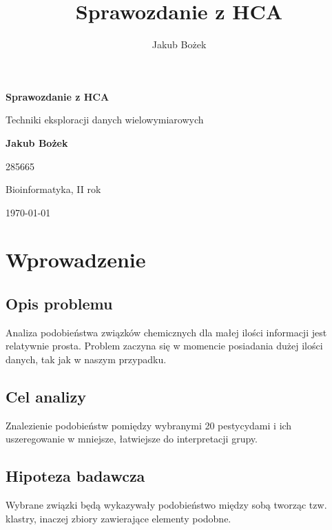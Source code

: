 \documentclass[12pt, a4paper]{article}
\author{Jakub Bożek}
\title{Sprawozdanie z HCA}
\begin{document}
\begin{titlepage}
    \centering
    {\LARGE \bfseries Sprawozdanie z HCA \par}
    \vspace{1cm}
    
    {\Large Techniki eksploracji danych wielowymiarowych \par}
    \vspace{2cm}
    
    {\LARGE \bfseries Jakub Bożek \par}
    \vspace{0.5cm}
    
    {\large 285665 \par}
    \vspace{0.5cm}
    
    {\large Bioinformatyka, II rok \par}
    \vspace{2cm}
    
    {\Large \today \par}
    
    \newpage
    \thispagestyle{empty}

    \tableofcontents
\end{titlepage}

\section{Wprowadzenie}

    \subsection{Opis problemu}
        Analiza podobieństwa związków chemicznych dla małej ilości informacji jest relatywnie prosta.
        Problem zaczyna się w momencie posiadania dużej ilości danych, tak jak w naszym przypadku.

    \subsection{Cel analizy}
        Znalezienie podobieństw pomiędzy wybranymi 20 pestycydami i ich uszeregowanie w mniejsze, łatwiejsze do interpretacji grupy.

    \subsection{Hipoteza badawcza}
        Wybrane związki będą wykazywały podobieństwo między sobą tworząc tzw. klastry, inaczej zbiory zawierające
        elementy podobne.
\end{document}
